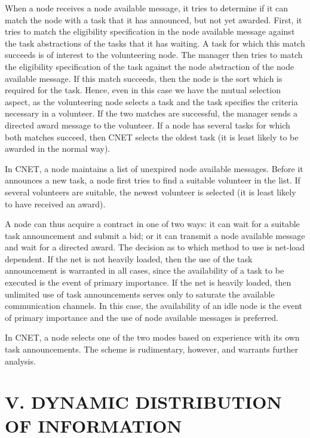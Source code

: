 \documentclass[
]{article}
\begin{document}
When a node receives a node available message, it tries to determine if
it can match the node with a task that it has announced, but not yet
awarded. First, it tries to match the eligibility specification in the
node available message against the task abstractions of the tasks that
it has waiting. A task for which this match succeeds is of interest to
the volunteering node. The manager then tries to match the eligibility
specification of the task against the node abstraction of the node
available message. If this match succeeds, then the node is the sort
which is required for the task. Hence, even in this case we have the
mutual selection aspect, as the volunteering node selects a task and the
task specifies the criteria necessary in a volunteer. If the two matches
are successful, the manager sends a directed award message to the
volunteer. If a node has several tasks for which both matches succeed,
then CNET selects the oldest task (it is least likely to be awarded in
the normal way).

In CNET, a node maintains a list of unexpired node available messages.
Before it announces a new task, a node first tries to find a suitable
volunteer in the list. If several volunteers are suitable, the newest
volunteer is selected (it is least likely to have received an award).

A node can thus acquire a contract in one of two ways: it can wait for a
suitable task announcement and submit a bid; or it can transmit a node
available message and wait for a directed award. The decision as to
which method to use is net-load dependent. If the net is not heavily
loaded, then the use of the task announcement is warranted in all cases,
since the availability of a task to be executed is the event of primary
importance. If the net is heavily loaded, then unlimited use of task
announcements serves only to saturate the available communication
channels. In this case, the availability of an idle node is the event of
primary importance and the use of node available messages is preferred.

In CNET, a node selects one of the two modes based on experience with
its own task announcements. The scheme is rudimentary, however, and
warrants further analysis.

\section{V. DYNAMIC DISTRIBUTION OF
INFORMATION}\label{v.-dynamic-distribution-of-information}
\end{document}
